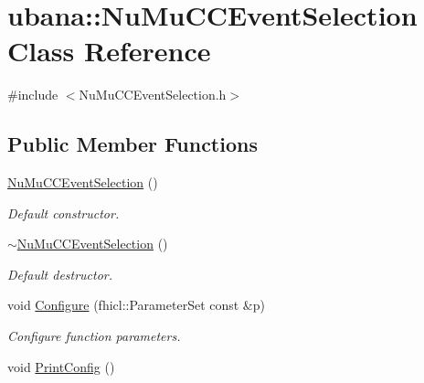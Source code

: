 \hypertarget{classubana_1_1NuMuCCEventSelection}{\section{ubana\-:\-:Nu\-Mu\-C\-C\-Event\-Selection Class Reference}
\label{classubana_1_1NuMuCCEventSelection}
}


{\ttfamily \#include $<$Nu\-Mu\-C\-C\-Event\-Selection.\-h$>$}

\subsection*{Public Member Functions}
\begin{DoxyCompactItemize}
\item 
\hypertarget{classubana_1_1NuMuCCEventSelection_a8c96431500a98d4493a70dc715f3d00d}{\hyperlink{classubana_1_1NuMuCCEventSelection_a8c96431500a98d4493a70dc715f3d00d}{Nu\-Mu\-C\-C\-Event\-Selection} ()}\label{classubana_1_1NuMuCCEventSelection_a8c96431500a98d4493a70dc715f3d00d}

\begin{DoxyCompactList}\small\item\em Default constructor. \end{DoxyCompactList}\item 
\hypertarget{classubana_1_1NuMuCCEventSelection_a02e9e44da798b1ab984e373abf6fb795}{\hyperlink{classubana_1_1NuMuCCEventSelection_a02e9e44da798b1ab984e373abf6fb795}{$\sim$\-Nu\-Mu\-C\-C\-Event\-Selection} ()}\label{classubana_1_1NuMuCCEventSelection_a02e9e44da798b1ab984e373abf6fb795}

\begin{DoxyCompactList}\small\item\em Default destructor. \end{DoxyCompactList}\item 
\hypertarget{classubana_1_1NuMuCCEventSelection_a8395dc0a9642df63c192feccd24265f2}{void \hyperlink{classubana_1_1NuMuCCEventSelection_a8395dc0a9642df63c192feccd24265f2}{Configure} (fhicl\-::\-Parameter\-Set const \&p)}\label{classubana_1_1NuMuCCEventSelection_a8395dc0a9642df63c192feccd24265f2}

\begin{DoxyCompactList}\small\item\em Configure function parameters. \end{DoxyCompactList}\item 
\hypertarget{classubana_1_1NuMuCCEventSelection_a25fadae27bbb94bcdd86a11564c47be9}{void \hyperlink{classubana_1_1NuMuCCEventSelection_a25fadae27bbb94bcdd86a11564c47be9}{Print\-Config} ()}\label{classubana_1_1NuMuCCEventSelection_a25fadae27bbb94bcdd86a11564c47be9}


\end{DoxyCompactItemize}
